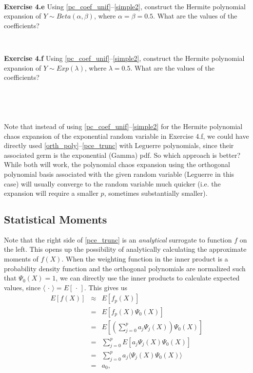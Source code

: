 \documentclass[11pt]{article}
\numberwithin{equation}{section}
\begin{document}
\

\textbf{Exercise 4.e} Using \eqref{pc_coef_unif}--\eqref{simple2}, construct the Hermite polynomial expansion of $Y \sim Beta(\alpha, \beta)$, where $\alpha = \beta = 0.5$. What are the values of the coefficients?

\

\textbf{Exercise 4.f} Using \eqref{pc_coef_unif}--\eqref{simple2}, construct the Hermite polynomial expansion of $Y \sim Exp(\lambda)$, where $\lambda = 0.5$. What are the values of the coefficients?

\

\





Note that instead of using \eqref{pc_coef_unif}--\eqref{simple2} for the Hermite polynomial chaos expansion of the exponential random variable in Exercise 4.f, we could have directly used \eqref{orth_poly}--\eqref{pce_trunc} with Leguerre polynomials, since their associated germ is the exponential (Gamma) pdf. So which approach is better? While both will work, the polynomial chaos expansion using the orthogonal polynomial basis associated with the given random variable (Leguerre in this case) will usually converge to the random variable much quicker (i.e. the expansion will require a smaller $p$, sometimes substantially smaller).






\subsection{Statistical Moments}

Note that the right side of \eqref{pce_trunc} is an {\em analytical} surrogate to function $f$ on the left. This opens up the possibility of analytically calculating the approximate moments of $f(X)$. When the weighting function in the inner product is a probability density function and the orthogonal polynomials are normalized such that $\Psi_0(X) = 1$, we can directly use the inner products to calculate expected values, since $\langle \, \cdot \, \rangle = E[ \, \cdot \, ]$. This gives us
\begin{eqnarray}
E [ f(X) ] & \approx & E [ f_p(X) ] \nonumber \\
& = & E [ f_p(X) \Psi_0(X) ] \nonumber \\
& = & E \left[ \left( \sum_{j = 0}^p a_j \Psi_j(X) \right) \Psi_0(X) \right] \nonumber \\
& = & \sum_{j = 0}^p  E \left[ a_j \Psi_j(X) \Psi_0(X) \right] \nonumber \\
& = & \sum_{j = 0}^p   a_j \langle \Psi_j(X) \Psi_0(X) \rangle  \nonumber \\
& = & a_0, \label{pce_mu}
\end{eqnarray}
\end{document}
